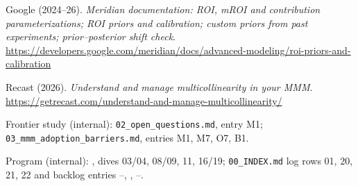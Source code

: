 \begin{enumerate}[label={[\arabic*]},leftmargin=2.5em]
\item Google (2024--26). \emph{Meridian documentation: ROI, mROI and contribution parameterizations; ROI priors and calibration; custom priors from past experiments; prior--posterior shift check}. \url{https://developers.google.com/meridian/docs/advanced-modeling/roi-priors-and-calibration}
\item Recast (2026). \emph{Understand and manage multicollinearity in your MMM}. \url{https://getrecast.com/understand-and-manage-multicollinearity/}
\item Frontier study (internal): \texttt{02\_open\_questions.md}, entry M1; \texttt{03\_mmm\_adoption\_barriers.md}, entries M1, M7, O7, B1.
\item Program (internal): , dives 03/04, 08/09, 11, 16/19; \texttt{00\_INDEX.md} log rows 01, 20, 21, 22 and backlog entries --, , --.
\end{enumerate}
\endgroup
